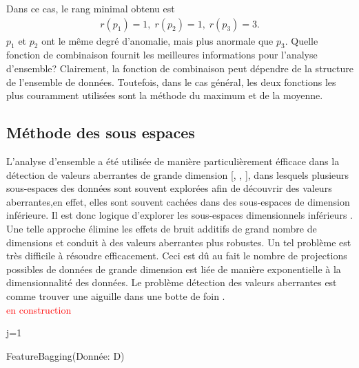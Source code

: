 Dans ce cas, le rang minimal obtenu est
\begin{align*}
r\left(p_{1}\right)=1,\; r\left(p_{2}\right)=1,\; r \left(p_{3}\right)=3.
\end{align*}
$p_1$ et $p_2$ ont le même degré d'anomalie, mais plus anormale que $p_3$. 
Quelle fonction de combinaison fournit les meilleures informations pour l'analyse d'ensemble?
Clairement, la fonction de combinaison peut dépendre de la structure de l'ensemble de données. Toutefois, dans le cas général, les deux fonctions les plus couramment utilisées sont la méthode du maximum et de la moyenne.
\subsection{Méthode des sous espaces}
L'analyse d'ensemble a été utilisée de manière particulièrement éfficace dans la détection de valeurs aberrantes de grande dimension [\cite{A8}, \cite{A13}, \cite{A14}], dans lesquels plusieurs sous-espaces des données sont souvent explorées afin de découvrir des valeurs aberrantes,en effet, elles sont souvent cachées dans des sous-espaces de dimension inférieure. Il est donc logique d'explorer les sous-espaces dimensionnels inférieurs \cite{A1}. Une telle approche élimine les effets de bruit additifs de grand nombre de dimensions et conduit à des valeurs aberrantes plus robustes. Un tel problème est très difficile à résoudre efficacement. Ceci est dû au fait le nombre de projections possibles de données de grande dimension est liée de manière exponentielle à la dimensionnalité des données. Le problème détection des valeurs aberrantes est comme trouver une aiguille dans une botte de foin \cite{A14}. \\
\textcolor{red}{en construction}

\begin{algorithm}
\SetAlgoLined
j=1\;
\caption{FeatureBagging(Donnée: D)}
\end{algorithm}



\afterpage{\FloatBarrier}